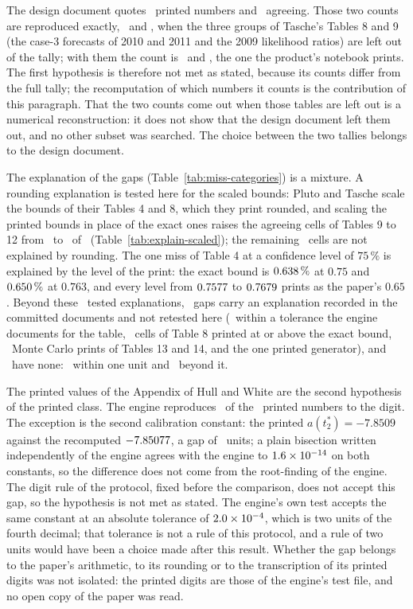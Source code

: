 The design document quotes \nSddN\ printed numbers and \nSddAgree\ agreeing. Those two counts are reproduced exactly, \nWithoutN\ and \nWithoutAgree, when the three groups of Tasche's Tables 8 and 9 (the case-3 forecasts of 2010 and 2011 and the 2009 likelihood ratios) are left out of the tally; with them the count is \nPrintedN\ and \nPrintedAgree, the one the product's notebook prints. The first hypothesis is therefore not met as stated, because its counts differ from the full tally; the recomputation of which numbers it counts is the contribution of this paragraph. That the two counts come out when those tables are left out is a numerical reconstruction: it does not show that the design document left them out, and no other subset was searched. The choice between the two tallies belongs to the design document.

The explanation of the gaps (Table~\ref{tab:miss-categories}) is a mixture. A rounding explanation is tested here for the scaled bounds: Pluto and Tasche scale the bounds of their Tables 4 and 8, which they print rounded, and scaling the printed bounds in place of the exact ones raises the agreeing cells of Tables 9 to 12 from \nScaledExact\ to \nScaledPrinted\ of \nScaledN\ (Table~\ref{tab:explain-scaled}); the remaining \nScaledLeft\ cells are not explained by rounding. The one miss of Table 4 at a confidence level of $75\,\%$ is explained by the level of the print: the exact bound is $0.638\,\%$ at $0.75$ and $0.650\,\%$ at $0.763$, and every level from $0.7577$ to $0.7679$ prints as the paper's $0.65$. Beyond these \nMissTested\ tested explanations, \nMissRecorded\ gaps carry an explanation recorded in the committed documents and not retested here (\nMissTol\ within a tolerance the engine documents for the table, \nMissAbove\ cells of Table 8 printed at or above the exact bound, \nMissMC\ Monte Carlo prints of Tables 13 and 14, and the one printed generator), and \nMissNone\ have none: \nMissNoneIn\ within one unit and \nMissNoneOut\ beyond it.




The printed values of the Appendix of Hull and White are the second hypothesis of the printed class. The engine reproduces \nWWAgree\ of the \nWWN\ printed numbers to the digit. The exception is the second calibration constant: the printed $a(t_2^{*})=-7.8509$ against the recomputed $-7.85077$, a gap of \nWWAtwoUnits\ units; a plain bisection written independently of the engine agrees with the engine to $1.6\times10^{-14}$ on both constants, so the difference does not come from the root-finding of the engine. The digit rule of the protocol, fixed before the comparison, does not accept this gap, so the hypothesis is not met as stated. The engine's own test accepts the same constant at an absolute tolerance of $2.0\times10^{-4}$, which is two units of the fourth decimal; that tolerance is not a rule of this protocol, and a rule of two units would have been a choice made after this result. Whether the gap belongs to the paper's arithmetic, to its rounding or to the transcription of its printed digits was not isolated: the printed digits are those of the engine's test file, and no open copy of the paper was read.

